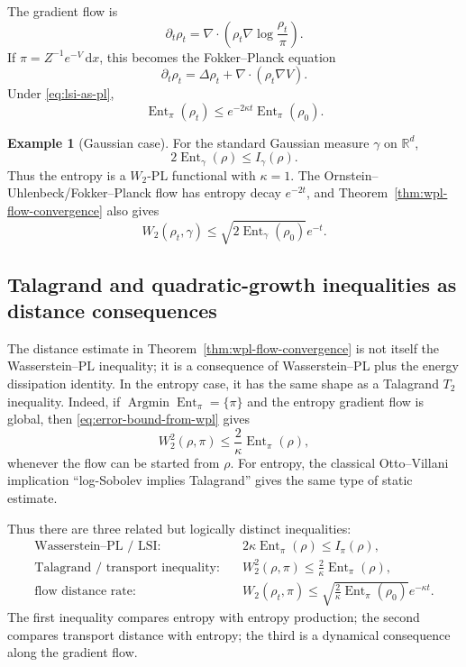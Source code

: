\documentclass[11pt]{article}
\theoremstyle{definition}
\newtheorem{example}[theorem]{Example}
\DeclareMathOperator{\Ent}{Ent}
\newcommand{\W}{W_2}
\newcommand{\R}{\mathbb R}
\newcommand{\dd}{\,\mathrm d}
\begin{document}
The gradient flow is
\begin{equation}
        \partial_t\rho_t
        =\nabla\cdot\left(\rho_t\nabla\log\frac{\rho_t}{\pi}\right).
        \label{eq:fokker-planck-general}
\end{equation}
If $\pi=Z^{-1}e^{-V}\dd x$, this becomes the Fokker--Planck equation
\begin{equation}
        \partial_t\rho_t
        =\Delta\rho_t+\nabla\cdot(\rho_t\nabla V).
        \label{eq:fokker-planck}
\end{equation}
Under \eqref{eq:lsi-as-pl},
\[
        \Ent_\pi(\rho_t)
        \le e^{-2\kappa t}\Ent_\pi(\rho_0).
\]

\begin{example}[Gaussian case]
For the standard Gaussian measure $\gamma$ on $\R^d$,
\[
        2\Ent_\gamma(\rho)\le I_\gamma(\rho).
\]
Thus the entropy is a $\W$-PL functional with $\kappa=1$. The Ornstein--Uhlenbeck/Fokker--Planck flow has entropy decay $e^{-2t}$, and Theorem~\ref{thm:wpl-flow-convergence} also gives
\[
        \W(\rho_t,\gamma)
        \le \sqrt{2\Ent_\gamma(\rho_0)}e^{-t}.
\]
\end{example}


\subsection{Talagrand and quadratic-growth inequalities as distance consequences}

The distance estimate in Theorem~\ref{thm:wpl-flow-convergence} is not itself the Wasserstein--PL inequality; it is a consequence of Wasserstein--PL plus the energy dissipation identity. In the entropy case, it has the same shape as a Talagrand $T_2$ inequality. Indeed, if $\operatorname{Argmin}\Ent_\pi=\{\pi\}$ and the entropy gradient flow is global, then \eqref{eq:error-bound-from-wpl} gives
\begin{equation}
        \W^2(\rho,\pi)
        \le \frac{2}{\kappa}\Ent_\pi(\rho),
        \label{eq:t2-from-wpl-dynamic}
\end{equation}
whenever the flow can be started from $\rho$. For entropy, the classical Otto--Villani implication ``log-Sobolev implies Talagrand'' gives the same type of static estimate.

Thus there are three related but logically distinct inequalities:
\begin{align*}
        \text{Wasserstein--PL / LSI:}\quad
        &2\kappa\Ent_\pi(\rho)\le I_\pi(\rho),\\
        \text{Talagrand / transport inequality:}\quad
        &\W^2(\rho,\pi)\le \frac{2}{\kappa}\Ent_\pi(\rho),\\
        \text{flow distance rate:}\quad
        &\W(\rho_t,\pi)\le
          \sqrt{\frac{2}{\kappa}\Ent_\pi(\rho_0)}e^{-\kappa t}.
\end{align*}
The first inequality compares entropy with entropy production; the second compares transport distance with entropy; the third is a dynamical consequence along the gradient flow.
\end{document}

